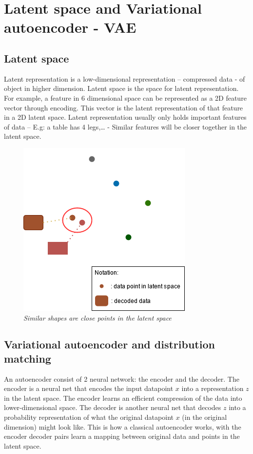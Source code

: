 \documentclass[12pt]{report}
\begin{document}
\section{Latent space and Variational autoencoder - VAE}
\subsection{Latent space}
Latent representation is a low-dimensional representation  – compressed data - of object in higher dimension. Latent space is the space for latent representation. For example, a feature in 6 dimensional space can be represented as a 2D feature vector through encoding. This vector is the latent representation of that feature in a 2D latent space.
Latent representation usually only holds important features of data –  E.g: a table has 4 legs,… - Similar features will be closer together in the latent space.
\begin{figure}[h]
	\centering
	\includegraphics[scale=1]{latent-space}
	\caption{\textit{Similar shapes are close points in the latent space}}
	\label{fig:latent-space}
\end{figure}

\subsection{Variational autoencoder and distribution matching}
An autoencoder consist of 2 neural network: the encoder and the decoder.
The encoder is a neural net that encodes the input datapoint $x$ into a representation $z$ in the latent space. The encoder learns an efficient compression of the data into lower-dimensional space.
The decoder is another neural net that decodes $z$ into a probability representation of what the original datapoint $x$ (in the original dimension) might look like.
This is how a classical autoencoder works, with the encoder decoder pairs learn a mapping between original data and points in the latent space.
\end{document}
